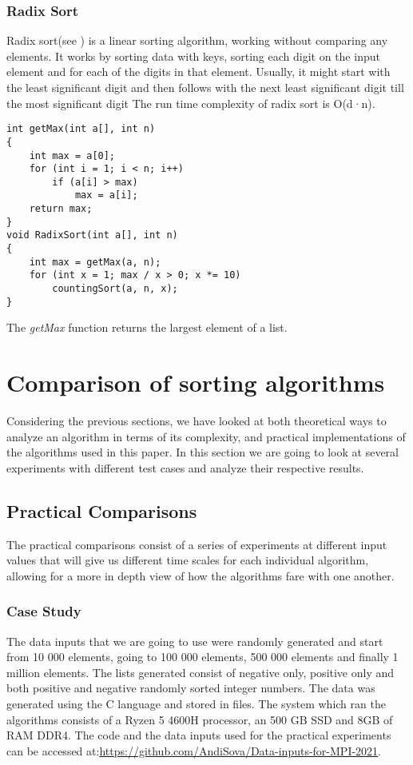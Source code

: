 \documentclass{article}
\numberwithin{figure}{section}
\begin{document}
\subsubsection{Radix Sort}

Radix sort(see \cite{Thomas}) is a linear sorting algorithm, working without comparing any elements. It works by sorting data with keys, sorting each digit on the input element and for each of the digits in that element. Usually, it might start with the least significant digit and then follows with the next least significant digit till the most significant digit The run time complexity of radix sort is O(d·n).

\begin{lstlisting}[frame=none]
int getMax(int a[], int n)
{
    int max = a[0];
    for (int i = 1; i < n; i++)
        if (a[i] > max)
            max = a[i];
    return max;
}
void RadixSort(int a[], int n)
{
    int max = getMax(a, n);
    for (int x = 1; max / x > 0; x *= 10)
        countingSort(a, n, x);
}
\end{lstlisting}

The \textit{getMax} function returns the largest element of a list.

\section{Comparison of sorting algorithms}

Considering the previous sections, we have looked at both theoretical ways to analyze an algorithm in terms of its complexity, and practical implementations of the algorithms used in this paper. In this section we are going to look at several experiments with different test cases and analyze their respective results. 

\subsection{Practical Comparisons}

The practical comparisons consist of a series of experiments at different input values that will give us different time scales for each individual algorithm, allowing for a more in depth view of how the  algorithms fare with one another.

\subsubsection{Case Study}

The data inputs that we are going to use were randomly generated and start from 10 000 elements, going to 100 000 elements, 500 000 elements and finally 1 million elements. The lists generated consist of negative only, positive only and both positive and negative randomly sorted integer numbers. The data was generated using the C language and stored in files. The system which ran the algorithms consists of a Ryzen 5 4600H processor, an 500 GB SSD and 8GB of RAM DDR4. The code and the data inputs used for the practical experiments can be accessed at:\url{https://github.com/AndiSova/Data-inputs-for-MPI-2021}. 
\end{document}
